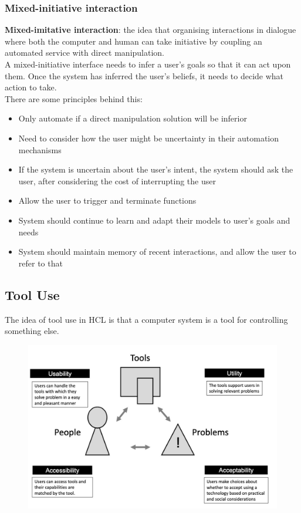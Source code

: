 \documentclass{article}
\begin{document}
\subsubsection{Mixed-initiative interaction}
\textbf{Mixed-imitative interaction}: the idea that organising interactions in dialogue where both the computer and human can take initiative by coupling an automated service with direct manipulation. \\
A mixed-initiative interface needs to infer a user's goals so that it can act upon them. Once the system has inferred the user's beliefs, it needs to decide what action to take. \\
There are some principles behind this:
\begin{itemize}
    \item Only automate if a direct manipulation solution will be inferior
    \item Need to consider how the user might be uncertainty in their automation mechanisms
    \item If the system is uncertain about the user's intent, the system should ask the user, after considering the cost of interrupting the user
    \item Allow the user to trigger and terminate functions
    \item System should continue to learn and adapt their models to user's goals and needs
    \item System should maintain memory of recent interactions, and allow the user to refer to that
\end{itemize}
\subsection{Tool Use}
The idea of tool use in HCL is that a computer system is a tool for controlling something else. 
\begin{figure}[H]
    \centering
    \includegraphics[width=0.6\linewidth]{Pictures/Screenshot 2023-03-01 at 12.05.43.png}
\end{figure}
\end{document}
